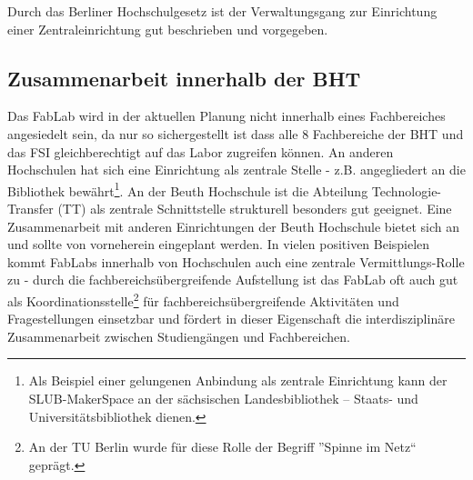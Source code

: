 \documentclass[parskip=half,headsepline,footsepline,titlepage]{scrartcl}
\begin{document}
Durch das Berliner Hochschulgesetz ist der Verwaltungsgang zur Einrichtung einer Zentraleinrichtung gut beschrieben und vorgegeben.

\subsection{Zusammenarbeit innerhalb der BHT}

Das FabLab wird in der aktuellen Planung nicht innerhalb eines Fachbereiches angesiedelt sein, da nur so sichergestellt ist dass alle 8 Fachbereiche der BHT und das FSI gleichberechtigt auf das Labor zugreifen können. An anderen Hochschulen hat sich eine Einrichtung als zentrale Stelle - z.B. angegliedert an die Bibliothek bewährt\footnote{Als Beispiel einer gelungenen Anbindung als zentrale Einrichtung kann der SLUB-MakerSpace an der sächsischen Landesbibliothek – Staats- und Universitätsbibliothek dienen.}. An der Beuth Hochschule ist die Abteilung Technologie-Transfer (TT) als zentrale Schnittstelle strukturell besonders gut geeignet. Eine Zusammenarbeit mit anderen Einrichtungen der Beuth Hochschule bietet sich an und sollte von vorneherein eingeplant werden.
In vielen positiven Beispielen kommt FabLabs innerhalb von Hochschulen auch eine zentrale Vermittlungs-Rolle zu - durch die fachbereichsübergreifende Aufstellung ist das FabLab oft auch gut als Koordinationsstelle\footnote{An der TU Berlin wurde für diese Rolle der Begriff ''Spinne im Netz`` geprägt.} für fachbereichsübergreifende Aktivitäten und Fragestellungen einsetzbar und fördert in dieser Eigenschaft die interdisziplinäre Zusammenarbeit zwischen Studiengängen und Fachbereichen.
\end{document}
